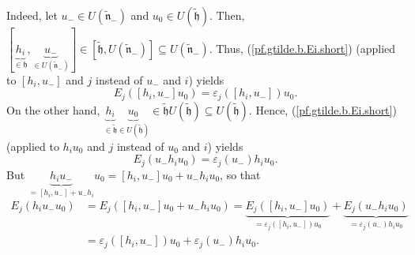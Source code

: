 \documentclass[etingof-lie.tex]{subfiles}
\begin{document}
\begin{vershort}
Indeed, let $u_{-}\in U\left(  \widetilde{\mathfrak{n}}_{-}\right)  $ and
$u_{0}\in U\left(  \widetilde{\mathfrak{h}}\right)  $. Then, $\left[
\underbrace{h_{i}}_{\in\mathfrak{h}},\underbrace{u_{-}}_{\in U\left(
\widetilde{\mathfrak{n}}_{-}\right)  }\right]  \in\left[
\widetilde{\mathfrak{h}},U\left(  \widetilde{\mathfrak{n}}_{-}\right)
\right]  \subseteq U\left(  \widetilde{\mathfrak{n}}_{-}\right)  $. Thus,
(\ref{pf.gtilde.b.Ei.short}) (applied to $\left[  h_{i},u_{-}\right]  $ and
$j$ instead of $u_{-}$ and $i$) yields%
\[
E_{j}\left(  \left[  h_{i},u_{-}\right]  u_{0}\right)  =\varepsilon_{j}\left(
\left[  h_{i},u_{-}\right]  \right)  u_{0}.
\]
On the other hand, $\underbrace{h_{i}}_{\in\widetilde{\mathfrak{h}}%
}\underbrace{u_{0}}_{\in U\left(  \widetilde{\mathfrak{h}}\right)  }%
\in\widetilde{\mathfrak{h}}U\left(  \widetilde{\mathfrak{h}}\right)  \subseteq
U\left(  \widetilde{\mathfrak{h}}\right)  $. Hence,
(\ref{pf.gtilde.b.Ei.short}) (applied to $h_{i}u_{0}$ and $j$ instead of
$u_{0}$ and $i$) yields%
\[
E_{j}\left(  u_{-}h_{i}u_{0}\right)  =\varepsilon_{j}\left(  u_{-}\right)
h_{i}u_{0}.
\]
But $\underbrace{h_{i}u_{-}}_{=\left[  h_{i},u_{-}\right]  +u_{-}h_{i}}%
u_{0}=\left[  h_{i},u_{-}\right]  u_{0}+u_{-}h_{i}u_{0}$, so that
\begin{align*}
E_{j}\left(  h_{i}u_{-}u_{0}\right)   &  =E_{j}\left(  \left[  h_{i}%
,u_{-}\right]  u_{0}+u_{-}h_{i}u_{0}\right)  =\underbrace{E_{j}\left(  \left[
h_{i},u_{-}\right]  u_{0}\right)  }_{=\varepsilon_{j}\left(  \left[
h_{i},u_{-}\right]  \right)  u_{0}}+\underbrace{E_{j}\left(  u_{-}h_{i}%
u_{0}\right)  }_{=\varepsilon_{j}\left(  u_{-}\right)  h_{i}u_{0}}\\
&  =\varepsilon_{j}\left(  \left[  h_{i},u_{-}\right]  \right)  u_{0}%
+\varepsilon_{j}\left(  u_{-}\right)  h_{i}u_{0}.
\end{align*}



\end{vershort}
\end{document}
